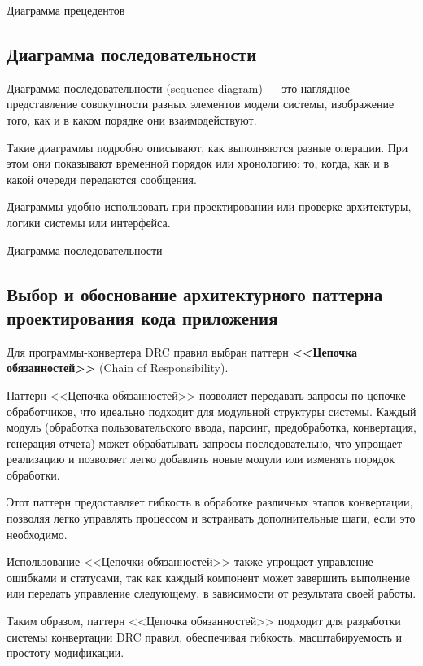 \begin{image}
	\caption{Диаграмма прецедентов}
	\label{fig:use:case}
\end{image}

\subsection{Диаграмма последовательности}

Диаграмма последовательности (sequence diagram) --- это наглядное
представление совокупности разных элементов модели системы,
изображение того, как и в каком порядке они взаимодействуют.\par
Такие диаграммы подробно описывают, как выполняются разные операции.
При этом они показывают временной порядок или хронологию:
то, когда, как и в какой очереди передаются сообщения.\par
Диаграммы удобно использовать при проектировании или проверке архитектуры,
логики системы или интерфейса.

\begin{image}
	\caption{Диаграмма последовательности}
	\label{fig:sequence}
\end{image}

\subsection{Выбор и обоснование архитектурного
	паттерна проектирования кода приложения}

Для программы-конвертера DRC правил выбран паттерн
\textbf{<<Цепочка обязанностей>>} (Chain of Responsibility).\par
Паттерн <<Цепочка обязанностей>> позволяет передавать запросы
по цепочке обработчиков,
что идеально подходит для модульной структуры системы.
Каждый модуль (обработка пользовательского ввода, парсинг,
предобработка, конвертация, генерация отчета)
может обрабатывать запросы последовательно,
что упрощает реализацию и позволяет легко добавлять новые модули
или изменять порядок обработки.\par
Этот паттерн предоставляет гибкость в обработке различных этапов конвертации,
позволяя легко управлять процессом и встраивать дополнительные шаги,
если это необходимо.\par
Использование <<Цепочки обязанностей>> также упрощает управление ошибками
и статусами, так как каждый компонент может завершить выполнение
или передать управление следующему,
в зависимости от результата своей работы.\par
Таким образом, паттерн <<Цепочка обязанностей>> подходит
для разработки системы конвертации DRC правил, обеспечивая гибкость,
масштабируемость и простоту модификации.

